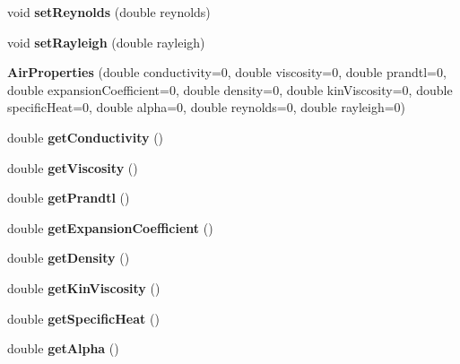 \begin{DoxyCompactItemize}
void {\bfseries set\+Reynolds} (double reynolds)
\item 
\mbox{\label{class_air_properties_a3f6aaaa2eb865479ff31c88529803bbf}} 
void {\bfseries set\+Rayleigh} (double rayleigh)
\item 
\mbox{\label{class_air_properties_a36a493e8472cb77f5810bdb00f46b980}} 
{\bfseries Air\+Properties} (double conductivity=0, double viscosity=0, double prandtl=0, double expansion\+Coefficient=0, double density=0, double kin\+Viscosity=0, double specific\+Heat=0, double alpha=0, double reynolds=0, double rayleigh=0)
\item 
\mbox{\label{class_air_properties_aed3b8e1d195b141e569885563a7059af}} 
double {\bfseries get\+Conductivity} ()
\item 
\mbox{\label{class_air_properties_afa27468d7215771f5bb8a9181234d6c0}} 
double {\bfseries get\+Viscosity} ()
\item 
\mbox{\label{class_air_properties_a448c8ea703d1e1a5cf73e30df0b9de8d}} 
double {\bfseries get\+Prandtl} ()
\item 
\mbox{\label{class_air_properties_ac6ea04ab5c76c2f9fd4c387077171ecb}} 
double {\bfseries get\+Expansion\+Coefficient} ()
\item 
\mbox{\label{class_air_properties_a13b2414ef175c1235c6404ae0d569291}} 
double {\bfseries get\+Density} ()
\item 
\mbox{\label{class_air_properties_ae5b3a7528ee3f6465381bfafd31d9089}} 
double {\bfseries get\+Kin\+Viscosity} ()
\item 
\mbox{\label{class_air_properties_ae488433b1f70ddee59dd695196a70891}} 
double {\bfseries get\+Specific\+Heat} ()
\item 
\mbox{\label{class_air_properties_ae6b00fbabd5fca301a600c007eaf63e5}} 
double {\bfseries get\+Alpha} ()
\item 
\mbox{\label{class_air_properties_a65c391506fe0e8928bd9735936fc431b}} 

\end{DoxyCompactItemize}
